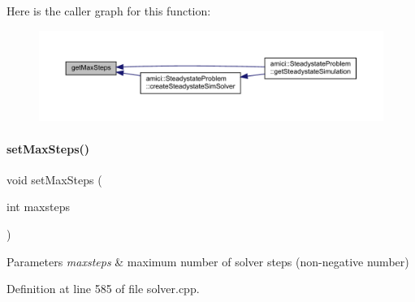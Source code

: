 Here is the caller graph for this function\+:
\nopagebreak
\begin{figure}[H]
\begin{center}
\leavevmode
\includegraphics[width=350pt]{classamici_1_1_solver_acf39690ae4c940c7734fc3fadabb4d50_icgraph}
\end{center}
\end{figure}
\mbox{\label{classamici_1_1_solver_ab321627a9f9d22013638e0eb9b14d2dc}} 
\paragraph{\texorpdfstring{set\+Max\+Steps()}{setMaxSteps()}}
{\footnotesize\ttfamily void set\+Max\+Steps (\begin{DoxyParamCaption}\item[{int}]{maxsteps }\end{DoxyParamCaption})}


\begin{DoxyParams}{Parameters}
{\em maxsteps} & maximum number of solver steps (non-\/negative number) \\
\hline
\end{DoxyParams}


Definition at line 585 of file solver.\+cpp.

